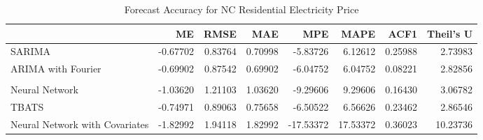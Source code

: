\documentclass[
]{article}
\newenvironment{Shaded}{\begin{snugshade}}{\end{snugshade}}
\newcommand{\CommentTok}[1]{\textcolor[rgb]{0.56,0.35,0.01}{\textit{#1}}}
\newcommand{\FunctionTok}[1]{\textcolor[rgb]{0.00,0.00,0.00}{#1}}
\newcommand{\NormalTok}[1]{#1}
\newcommand{\OtherTok}[1]{\textcolor[rgb]{0.56,0.35,0.01}{#1}}
\newcommand{\SpecialCharTok}[1]{\textcolor[rgb]{0.00,0.00,0.00}{#1}}
\newcommand{\StringTok}[1]{\textcolor[rgb]{0.31,0.60,0.02}{#1}}
\begin{document}
\begin{table}[!h]

\caption{\label{tab:unnamed-chunk-21}Forecast Accuracy for NC Residential Electricity Price}
\centering
\begin{tabular}[t]{l|r|r|r|r|r|r|r}
\hline
  & ME & RMSE & MAE & MPE & MAPE & ACF1 & Theil's U\\
\hline
SARIMA & -0.67702 & 0.83764 & 0.70998 & -5.83726 & 6.12612 & 0.25988 & 2.73983\\
\hline
ARIMA with Fourier & -0.69902 & 0.87542 & 0.69902 & -6.04752 & 6.04752 & 0.08221 & 2.82856\\
\hline
\cellcolor{red}{STL} & \cellcolor{red}{-0.58551} & \cellcolor{red}{0.76708} & \cellcolor{red}{0.63447} & \cellcolor{red}{-5.01390} & \cellcolor{red}{5.43949} & \cellcolor{red}{0.25835} & \cellcolor{red}{2.36056}\\
\hline
Neural Network & -1.03620 & 1.21103 & 1.03620 & -9.29606 & 9.29606 & 0.16430 & 3.06782\\
\hline
TBATS & -0.74971 & 0.89063 & 0.75658 & -6.50522 & 6.56626 & 0.23462 & 2.86546\\
\hline
Neural Network with Covariates & -1.82992 & 1.94118 & 1.82992 & -17.53372 & 17.53372 & 0.36023 & 10.23736\\
\hline
\end{tabular}
\end{table}

\begin{Shaded}
\end{Shaded}
\end{document}
